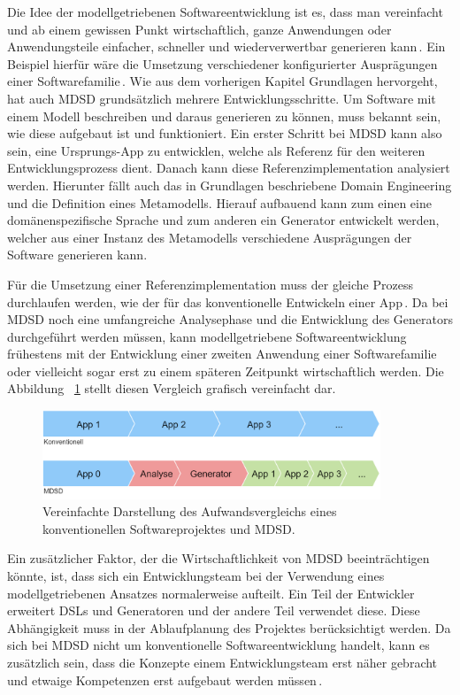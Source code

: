 \documentclass[12pt,oneside,a4paper,parskip]{scrbook}
\begin{document}
Die Idee der modellgetriebenen Softwareentwicklung ist es, dass man vereinfacht und ab einem gewissen Punkt wirtschaftlich, ganze Anwendungen oder Anwendungsteile einfacher, schneller und wiederverwertbar generieren kann\,\cite[S. 14f.]{stahl2007}. Ein Beispiel hierfür wäre die Umsetzung verschiedener konfigurierter Ausprägungen einer Softwarefamilie\,\cite[S. 237ff.]{stahl2007}. Wie aus dem vorherigen Kapitel Grundlagen hervorgeht, hat auch MDSD grundsätzlich mehrere Entwicklungsschritte. Um Software mit einem Modell beschreiben und daraus generieren zu können, muss bekannt sein, wie diese aufgebaut ist und funktioniert. Ein erster Schritt bei MDSD kann also sein, eine Ursprungs-App zu entwicklen, welche als Referenz für den weiteren Entwicklungsprozess dient. Danach kann diese Referenzimplementation analysiert werden. Hierunter fällt auch das in Grundlagen beschriebene Domain Engineering und die Definition eines Metamodells. Hierauf aufbauend kann zum einen eine domänenspezifische Sprache und zum anderen ein Generator entwickelt werden, welcher aus einer Instanz des Metamodells verschiedene Ausprägungen der Software generieren kann.

Für die Umsetzung einer Referenzimplementation muss der gleiche Prozess durchlaufen werden, wie der für das konventionelle Entwickeln einer App\,\cite[S. 219f.]{stahl2007}. Da bei MDSD noch eine umfangreiche Analysephase und die Entwicklung des Generators durchgeführt werden müssen, kann modellgetriebene Softwareentwicklung frühestens mit der Entwicklung einer zweiten Anwendung einer Softwarefamilie oder vielleicht sogar erst zu einem späteren Zeitpunkt wirtschaftlich werden. Die Abbildung ~\ref{fig:vgl1} stellt diesen Vergleich grafisch vereinfacht dar.

\begin{figure}[htbp]
\centering
\includegraphics[width=0.9\textwidth]{bilder/vergleich_1}
\caption{Vereinfachte Darstellung des Aufwandsvergleichs eines konventionellen Softwareprojektes und MDSD.}
\label{fig:vgl1}
\end{figure}

Ein zusätzlicher Faktor, der die Wirtschaftlichkeit von MDSD beeinträchtigen könnte, ist, dass sich ein Entwicklungsteam bei der Verwendung eines modellgetriebenen Ansatzes normalerweise aufteilt. Ein Teil der Entwickler erweitert DSLs und Generatoren und der andere Teil verwendet diese. Diese Abhängigkeit muss in der Ablaufplanung des Projektes berücksichtigt werden. Da sich bei MDSD nicht um konventionelle Softwareentwicklung handelt, kann es zusätzlich sein, dass die Konzepte einem Entwicklungsteam erst näher gebracht und etwaige Kompetenzen erst aufgebaut werden müssen\,\cite[S. 44ff.]{voelter2013}.
\end{document}
